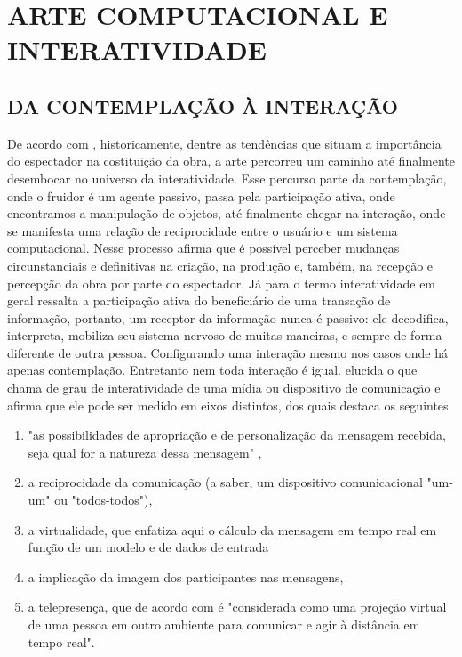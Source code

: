 \chapter{ARTE COMPUTACIONAL E INTERATIVIDADE}

\section{DA CONTEMPLAÇÃO À INTERAÇÃO}

De acordo com , historicamente, dentre as tendências que situam a importância do espectador na costituição da obra, a arte percorreu um caminho até finalmente desembocar no universo da interatividade. Esse percurso parte da contemplação, onde o fruidor é um agente passivo, passa pela participação ativa, onde encontramos a manipulação de objetos, até finalmente chegar na interação, onde se manifesta uma relação de reciprocidade entre o usuário e um sistema computacional. Nesse processo  afirma que é possível perceber mudanças circunstanciais e definitivas na criação, na produção e, também, na recepção e percepção da obra por parte do espectador. Já para  o termo interatividade em geral ressalta a participação ativa do beneficiário de uma transação de informação, portanto, um receptor da informação nunca é passivo: ele decodifica, interpreta, mobiliza seu sistema nervoso de muitas maneiras, e sempre de forma diferente de outra pessoa. Configurando uma interação mesmo nos casos onde há apenas contemplação. Entretanto nem toda interação é igual.  elucida o que chama de grau de interatividade de uma mídia ou dispositivo de comunicação e afirma que ele pode ser medido em eixos distintos, dos quais destaca os seguintes

\begin{enumerate}
\item "as possibilidades de apropriação e de personalização da mensagem recebida, seja qual for a natureza dessa mensagem" \cite[p. 82]{levy},
\item a reciprocidade da comunicação (a saber, um dispositivo comunicacional "um-um" ou
"todos-todos"),
\item a virtualidade, que enfatiza aqui o cálculo da mensagem em tempo real em função de um modelo e de dados de entrada
\item a implicação da imagem dos participantes nas mensagens, 
\item a telepresença, que de acordo com  é "considerada como uma projeção virtual de uma pessoa em outro ambiente para comunicar e agir à distância em tempo real".
\end{enumerate}



